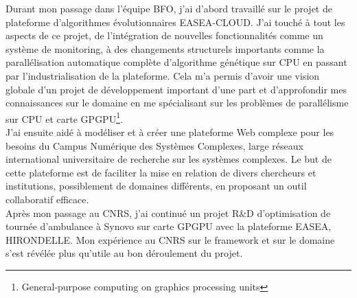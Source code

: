 \documentclass[french, 11pt]{memoir}
\begin{document}
\bigskip
Durant mon passage dans l'équipe BFO, j'ai d'abord travaillé sur le
projet de plateforme d'algorithmes évolutionnaires EASEA-CLOUD. J'ai
touché à tout les aspects de ce projet, de l'intégration de nouvelles
fonctionnalités comme un système de monitoring, à des changements
structurels importants comme la parallélisation automatique complète
d'algorithme génétique sur CPU en passant par l'industrialisation de la
plateforme. Cela m'a permis d'avoir une vision globale d'un projet de
développement important d'une part et d'approfondir mes connaissances
sur le domaine en me spécialisant sur les problèmes de parallélisme sur
CPU et carte GPGPU\footnote{General-purpose computing on graphics processing units}. \\
J'ai ensuite aidé à modéliser et à créer une plateforme Web complexe
pour les besoins du Campus Numérique des Systèmes Complexes, large
réseaux international universitaire de recherche sur les systèmes
complexes. Le but de cette plateforme est de faciliter la mise en
relation de divers chercheurs et institutions, possiblement de domaines
différents, en proposant un outil collaboratif efficace. \\
Après mon passage au CNRS, j'ai continué un projet R\&D d'optimisation
de tournée d'ambulance à Synovo sur carte GPGPU avec la plateforme
EASEA, HIRONDELLE. Mon expérience au CNRS sur le framework et sur le
domaine s'est révélée plus qu'utile au bon déroulement du projet.
\end{document}
